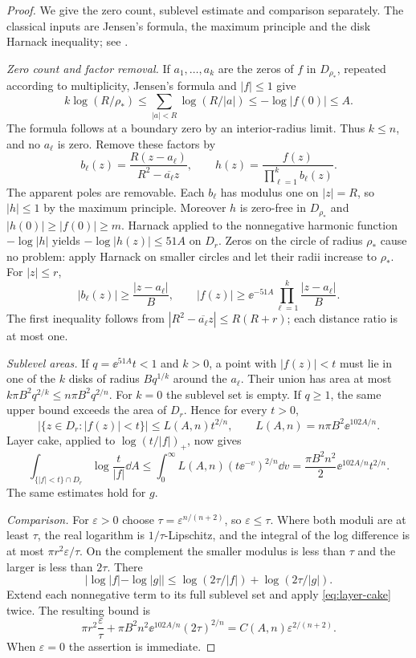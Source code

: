 \begin{proof}
We give the zero count, sublevel estimate and comparison separately.
The classical inputs are Jensen's formula, the maximum principle and
the disk Harnack inequality; see
\cite{Tao2020LocalZeros,Tao2016Harnack}.

\emph{Zero count and factor removal.}
If $a_1,\ldots,a_k$ are the zeros of $f$ in $D_{\rho_*}$, repeated
according to multiplicity, Jensen's formula and $|f|\le1$ give
\[
 k\log(R/\rho_*)\le
 \sum_{|a|<R}\log(R/|a|)
 \le-\log|f(0)|\le A .
\]
The formula follows at a boundary zero by an interior-radius limit.
Thus $k\le n$, and no $a_\ell$ is zero. Remove these factors by
\[
 b_\ell(z)=\frac{R(z-a_\ell)}{R^2-\overline{a_\ell}z},\qquad
 h(z)=\frac{f(z)}{\prod_{\ell=1}^k b_\ell(z)}.
\]
The apparent poles are removable. Each $b_\ell$ has modulus one on
$|z|=R$, so $|h|\le1$ by the maximum principle.
Moreover $h$ is zero-free in $D_{\rho_*}$ and
$|h(0)|\ge|f(0)|\ge m$. Harnack applied to the nonnegative harmonic
function $-\log|h|$ yields
$-\log|h(z)|\le51A$ on $D_r$. Zeros on the circle of radius
$\rho_*$ cause no problem: apply Harnack on smaller circles and
let their radii increase to $\rho_*$.
For $|z|\le r$,
\begin{equation}\label{eq:blaschke-lower}
 |b_\ell(z)|\ge\frac{|z-a_\ell|}{B},\qquad
 |f(z)|\ge\ee^{-51A}\prod_{\ell=1}^k\frac{|z-a_\ell|}{B}.
\end{equation}
The first inequality follows from
$|R^2-\overline{a_\ell}z|\le R(R+r)$; each distance ratio is
at most one.

\emph{Sublevel areas.}
If $q=\ee^{51A}t<1$ and $k>0$, a point with $|f(z)|<t$ must lie
in one of the $k$ disks of radius $Bq^{1/k}$ around the $a_\ell$.
Their union has area at most
$k\pi B^2q^{2/k}\le n\pi B^2q^{2/n}$.
For $k=0$ the sublevel set is empty. If $q\ge1$, the same upper
bound exceeds the area of $D_r$. Hence for every $t>0$,
\begin{equation}\label{eq:sublevel}
 \bigl|\{z\in D_r:|f(z)|<t\}\bigr|
 \le L(A,n)t^{2/n},\qquad
 L(A,n)=n\pi B^2\ee^{102A/n}.
\end{equation}
Layer cake, applied to $\log(t/|f|)_+$, now gives
\begin{equation}\label{eq:layer-cake}
 \int_{\{|f|<t\}\cap D_r}\log\frac{t}{|f|}\dd A
 \le\int_0^\infty L(A,n)(t\ee^{-v})^{2/n}\dd v
 =\frac{\pi B^2n^2}{2}\ee^{102A/n}t^{2/n}.
\end{equation}
The same estimates hold for $g$.

\emph{Comparison.}
For $\varepsilon>0$ choose
$\tau=\varepsilon^{n/(n+2)}$, so $\varepsilon\le\tau$.
Where both moduli are at least $\tau$, the real logarithm is
$1/\tau$-Lipschitz, and the integral of the log difference is at
most $\pi r^2\varepsilon/\tau$.
On the complement the smaller modulus is less than $\tau$ and the
larger is less than $2\tau$. There
\[
 |\log|f|-\log|g||
 \le\log(2\tau/|f|)+\log(2\tau/|g|).
\]
Extend each nonnegative term to its full sublevel set and apply
\eqref{eq:layer-cake} twice. The resulting bound is
\[
 \pi r^2\frac{\varepsilon}{\tau}
 +\pi B^2n^2\ee^{102A/n}(2\tau)^{2/n}
 =C(A,n)\varepsilon^{2/(n+2)}.
\]
When $\varepsilon=0$ the assertion is immediate.
\end{proof}

